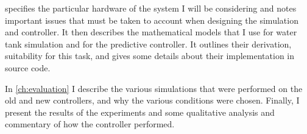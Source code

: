  specifies the particular hardware of the system I will be considering and notes important issues that must be taken to account when designing the simulation and controller.
It then describes the mathematical models that I use for water tank simulation and for the predictive controller.
It outlines their derivation, suitability for this task, and gives some details about their implementation in source code.

In \autoref{ch:evaluation} I describe the various simulations that were performed on the old and new controllers, and why the various conditions were chosen.
Finally, I present the results of the experiments and some qualitative analysis and commentary of how the controller performed.
